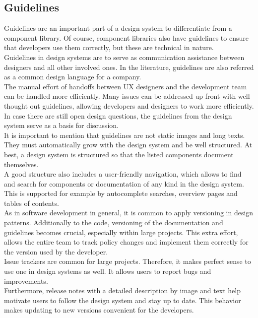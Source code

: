 \subsection{Guidelines}
Guidelines are an important part of a design system to differentiate from a component library. Of course, component libraries also have guidelines to ensure that developers use them correctly, but these are technical in nature.  \\
Guidelines in design systems are to serve as communication assistance between designers and all other involved ones. In the literature, guidelines are also referred as a common design language for a company.\\
The manual effort of handoffs between \ac{UX} designers and the development team can be handled more efficiently. Many issues can be addressed up front with well thought out guidelines, allowing developers and designers to work more efficiently. In case there are still open design questions, the guidelines from the design system serve as a basis for discussion. \cite{vesselov_building_2019} \\
It is important to mention that guidelines are not static images and long texts. They must automatically grow with the design system and be well structured. At best, a design system is structured so that the listed components document themselves. \\
A good structure also includes a user-friendly navigation, which allows to find and search for components or documentation of any kind in the design system. This is supported for example by autocomplete searches, overview pages and tables of contents.  \cite{macdonald_practical_2019}\cite{vesselov_building_2019} \\
As in software development in general, it is common to apply versioning in design patterns. Additionally to the code, versioning of the documentation and guidelines becomes crucial, especially within large projects. This extra effort, allows the entire team to track policy changes and implement them correctly for the version used by the developer. \\
Issue trackers are common for large projects. Therefore, it makes perfect sense to use one in design systems as well. It allows users to report bugs and improvements. \\
Furthermore, release notes with a detailed description by image and text help motivate users to follow the design system and stay up to date. This behavior makes updating to new versions convenient for the developers. \cite{macdonald_practical_2019} \\
